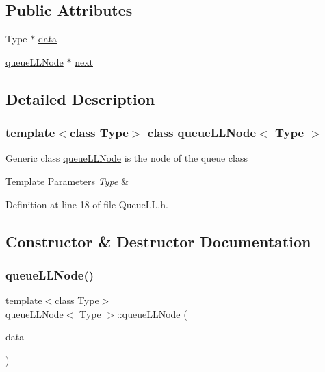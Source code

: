\subsection*{Public Attributes}
\begin{DoxyCompactItemize}
\item 
Type $\ast$ \hyperlink{classqueue_l_l_node_a20b1170d8c5852b7dc01e56fda4e4206}{data}
\item 
\hyperlink{classqueue_l_l_node}{queue\+L\+L\+Node} $\ast$ \hyperlink{classqueue_l_l_node_ab8367d61c51828d9f21d72537b62735f}{next}
\end{DoxyCompactItemize}


\subsection{Detailed Description}
\subsubsection*{template$<$class Type$>$\newline
class queue\+L\+L\+Node$<$ Type $>$}

Generic class \hyperlink{classqueue_l_l_node}{queue\+L\+L\+Node} is the node of the queue class 
\begin{DoxyTemplParams}{Template Parameters}
{\em Type} & \\
\hline
\end{DoxyTemplParams}


Definition at line 18 of file Queue\+L\+L.\+h.



\subsection{Constructor \& Destructor Documentation}
\mbox{\label{classqueue_l_l_node_a52a32e9e79f0b6cedeec1b9e68589354}} 
\subsubsection{\texorpdfstring{queue\+L\+L\+Node()}{queueLLNode()}}
{\footnotesize\ttfamily template$<$class Type$>$ \\
\hyperlink{classqueue_l_l_node}{queue\+L\+L\+Node}$<$ Type $>$\+::\hyperlink{classqueue_l_l_node}{queue\+L\+L\+Node} (\begin{DoxyParamCaption}\item[{Type $\ast$}]{data }\end{DoxyParamCaption})\hspace{0.3cm}{\ttfamily [inline]}}

